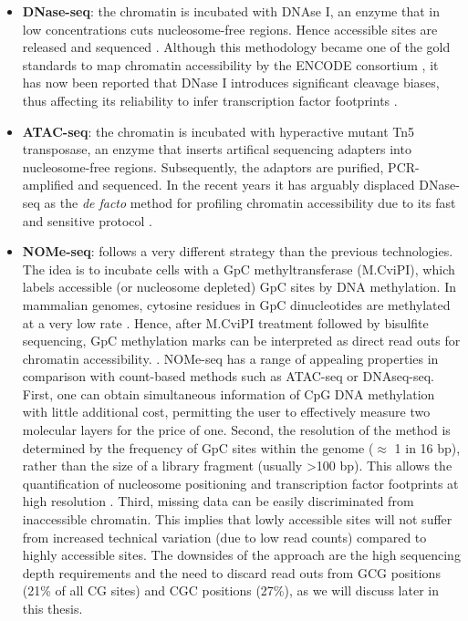 \begin{itemize}

	\item \textbf{DNase-seq}: the chromatin is incubated with DNAse I, an enzyme that in low concentrations cuts nucleosome-free regions. Hence accessible sites are released and sequenced \cite{Song2010}. Although this methodology became one of the gold standards to map chromatin accessibility by the ENCODE consortium \cite{ENCODE2012,Thurman2012}, it has now been reported that DNase I introduces significant cleavage biases, thus affecting its reliability to infer transcription factor footprints \cite{He2013}.

	\item \textbf{ATAC-seq}: the chromatin is incubated with hyperactive mutant Tn5 transposase, an enzyme that inserts artifical sequencing adapters into nucleosome-free regions. Subsequently, the adaptors are purified, PCR-amplified  and sequenced. In the recent years it has arguably displaced DNase-seq as the \textit{de facto} method for profiling chromatin accessibility due to its fast and sensitive protocol \cite{Buenrostro2015b,Tsompana2014,Nordstrom2019}.

	\item \textbf{NOMe-seq}: follows a very different strategy than the previous technologies. The idea is to incubate cells with a GpC methyltransferase (M.CviPI), which labels accessible (or nucleosome depleted) GpC sites by DNA methylation. In mammalian genomes, cytosine residues in GpC dinucleotides are methylated at a very low rate \cite{Kilgore2007}. Hence, after M.CviPI treatment followed by bisulfite sequencing, GpC methylation marks can be interpreted as direct read outs for chromatin accessibility. \cite{Kelly2012}. NOMe-seq has a range of appealing properties in comparison with count-based methods such as ATAC-seq or DNAseq-seq. First, one can obtain simultaneous information of CpG DNA methylation with little additional cost, permitting the user to effectively measure two molecular layers for the price of one. Second, the resolution of the method is determined by the frequency of GpC sites within the genome ($\approx$ 1 in 16 bp), rather than the size of a library fragment (usually >100 bp). This allows the quantification of nucleosome positioning and transcription factor footprints at high resolution \cite{Kelly2012,Pott2016,Nordstrom2019}. Third, missing data can be easily discriminated from inaccessible chromatin. This implies that lowly accessible sites will not suffer from increased technical variation (due to low read counts) compared to highly accessible sites.
	The downsides of the approach are the high sequencing depth requirements and the need to discard read outs from GCG positions (21\% of all CG sites) and CGC positions (27\%), as we will discuss later in this thesis.	

\end{itemize}


